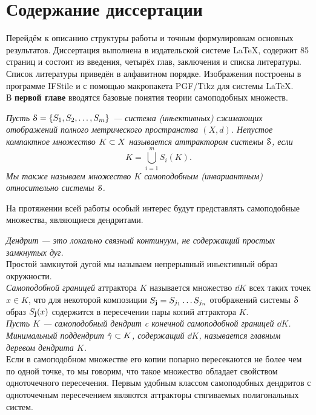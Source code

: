 \documentclass[a5paper,9pt,twoside]{extarticle} %
\begin{document}
\section{Содержание диссертации}

Перейдём к описанию структуры работы и точным формулировкам основных результатов.
Диссертация выполнена в издательской системе \LaTeX, содержит 85 страниц и состоит из введения, четырёх глав, заключения и списка литературы.
Список литературы приведён в алфавитном порядке.
Изображения построены в программе IFStile и с помощью макропакета PGF/Tikz для системы \LaTeX.\\


В \textbf{первой главе} вводятся базовые понятия теории самоподобных множеств.

{\em Пусть ${\EuScript S}=\{S_1, S_2, \ldots, S_m\}$ --- система (иньективных) сжимающих отображений полного метрического пространства $(X, d)$.
Непустое компактное множество $K\subset X$ называется аттрактором системы ${\EuScript S}$, если
$$K = \bigcup \limits_{i=1}^m S_i (K).$$
Мы также называем множество $K$ самоподобным (инвариантным) относительно системы ${\EuScript S}$.}\par

На протяжении всей работы особый интерес будут представлять самоподобные множества, являющиеся дендритами.

{\em {\em Дендрит} --- это локально связный континуум, не содержащий простых замкнутых дуг. }\\

Простой замкнутой дугой мы называем непрерывный иньективный образ окружности.\\

{\em Самоподобной границей} аттрактора $K$ называется множество $\dd K$ всех таких точек $x\in K$, что для некоторой композиции $S_{\bf{j}}=S_{j_1}\ldots S_{j_n}$ отображений системы ${\EuScript S}$ образ $S_{\bf{j}}(x)$ содержится в пересечении пары копий аттрактора $K$.\\

{\em Пусть $K$ --- самоподобный дендрит c конечной самоподобной границей $\dd K$.
Минимальный поддендрит $\hat\gamma\subset K$, содержащий $\dd K$, называется {\em главным деревом} дендрита $K$.}\\

Если в самоподобном множестве его копии попарно пересекаются не более чем по одной точке, то мы говорим, что такое множество обладает свойством одноточечного пересечения.
Первым удобным классом самоподобных дендритов с одноточечным пересечением являются аттракторы стягиваемых полигональных систем.\\
\end{document}
